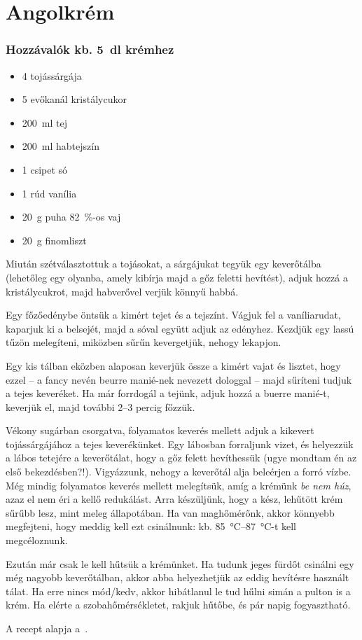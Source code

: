 \newpage
\section{Angolkrém} \label{sec:angolkrem}

\subsubsection*{Hozzávalók kb. \qty{5}{\deci\l} krémhez}
\begin{itemize}
    \item \num{4} tojássárgája
    \item \num{5} evőkanál kristálycukor
    \item \qty{200}{\ml} tej
    \item \qty{200}{\ml} habtejszín
    \item \num{1} csipet só
    \item \num{1} rúd vanília
    \item \qty{20}{\g} puha \qty{82}{\percent}-os vaj
    \item \qty{20}{\g} finomliszt
\end{itemize}

Miután szétválasztottuk a tojásokat, a sárgájukat tegyük egy keverőtálba (lehetőleg egy olyanba, amely kibírja majd a gőz feletti hevítést), adjuk hozzá a kristálycukrot, majd habverővel verjük könnyű habbá.

Egy főzőedénybe öntsük a kimért tejet és a tejszínt. Vágjuk fel a vaníliarudat, kaparjuk ki a belsejét, majd a sóval együtt adjuk az edényhez. Kezdjük egy lassú tűzön melegíteni, miközben sűrűn kevergetjük, nehogy lekapjon.

Egy kis tálban eközben alaposan keverjük össze a kimért vajat és lisztet, hogy ezzel -- a fancy nevén beurre manié-nek nevezett dologgal -- majd sűríteni tudjuk a tejes keveréket. Ha már forrdogál a tejünk, adjuk hozzá a buerre manié-t, keverjük el, majd további \numrange{2}{3} percig főzzük.

Vékony sugárban csorgatva, folyamatos keverés mellett adjuk a kikevert tojássárgájához a tejes keverékünket. Egy lábosban forraljunk vizet, és helyezzük a lábos tetejére a keverőtálat, hogy a gőz felett hevíthessük (ugye mondtam én az első bekezdésben?!). Vigyázzunk, nehogy a keverőtál alja beleérjen a forró vízbe. Még mindig folyamatos keverés mellett melegítsük, amíg a krémünk \emph{be nem húz}, azaz el nem éri a kellő redukálást. Arra készüljünk, hogy a kész, lehűtött krém sűrűbb lesz, mint meleg állapotában. Ha van maghőmérőnk, akkor könnyebb megfejteni, hogy meddig kell ezt csinálnunk: kb. \qtyrange{85}{87}{\celsius}-t kell megcéloznunk.

Ezután már csak le kell hűtsük a krémünket. Ha tudunk jeges fürdőt csinálni egy még nagyobb keverőtálban, akkor abba helyezhetjük az eddig hevítésre használt tálat. Ha erre nincs mód/kedv, akkor hibátlanul le tud hűlni simán a pulton is a krém. Ha elérte a szobahőmérsékletet, rakjuk hűtőbe, és pár napig fogyasztható.


A recept alapja a~\cite{szell_angolkrem}.
